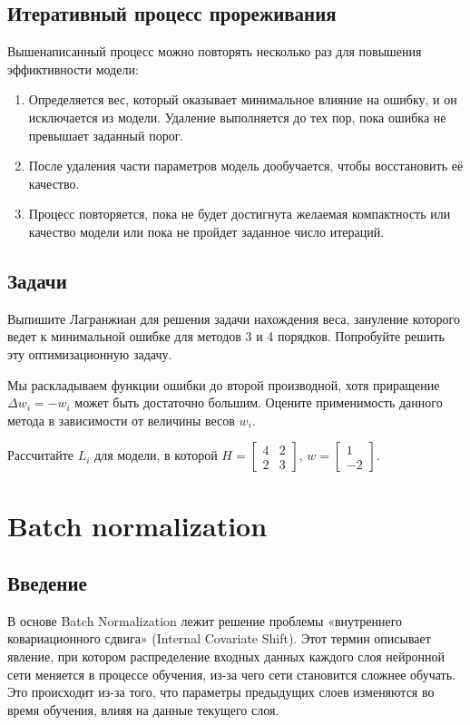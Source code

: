\subsection*{Итеративный процесс прореживания}
Вышенаписанный процесс можно повторять несколько раз для повышения эффиктивности модели:
\begin{enumerate}
    \item Определяется вес, который оказывает минимальное влияние на ошибку, и он исключается из модели.
    Удаление выполняется до тех пор, пока ошибка не превышает заданный порог.
    \item После удаления части параметров модель дообучается, чтобы восстановить её качество.
    \item Процесс повторяется, пока не будет достигнута желаемая компактность или качество модели или пока не пройдет заданное число итераций.
\end{enumerate}

\subsection*{Задачи}
\begin{task}
Выпишите Лагранжиан для решения задачи нахождения веса, зануление которого ведет к минимальной ошибке для методов 3 и 4 порядков. Попробуйте решить эту оптимизационную задачу.
\end{task}

\begin{task}
Мы раскладываем функции ошибки до второй производной, хотя приращение $\Delta w_i = -w_i$ может быть достаточно большим. Оцените применимость данного метода в зависимости от величины весов $w_i$.
\end{task}

\begin{task}
Рассчитайте $L_i$ для модели, в которой $H = \begin{bmatrix} 4 & 2 \\ 2 & 3 \end{bmatrix}$, $w = \begin{bmatrix} 1 \\ -2 \end{bmatrix}$.
\end{task}

\section{Batch normalization}

\subsection{Введение}
В основе Batch Normalization лежит решение проблемы «внутреннего ковариационного сдвига» (Internal Covariate Shift). Этот термин описывает явление, при котором распределение входных данных каждого слоя нейронной сети меняется в процессе обучения, из-за чего сети становится сложнее обучать. Это происходит из-за того, что параметры предыдущих слоев изменяются во время обучения, влияя на данные текущего слоя.

